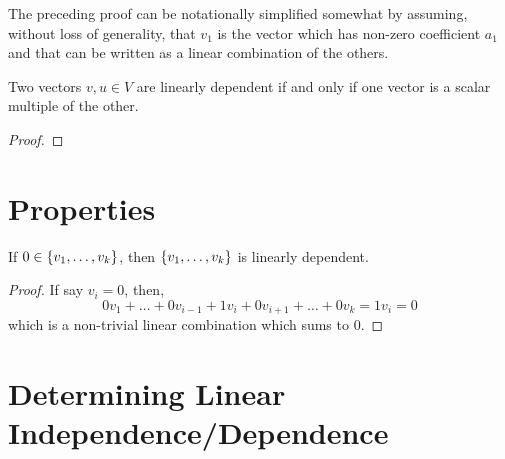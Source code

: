 \documentclass[letterpaper,12pt]{article}
\begin{document}
The preceding proof can be notationally simplified somewhat by assuming, without loss of generality, that $v_1$ is the vector which has non-zero coefficient $a_1$ and that can be written as a linear combination of the others.

\begin{corollary}
Two vectors $v, u \in V$ are linearly dependent if and only if one vector is a scalar multiple of the other.
\end{corollary}

\begin{proof}

\end{proof}

\section*{Properties}
\begin{example}
If $0 \in \left\{ v_1, \dots, v_k \right\}$, then $\left\{ v_1, \dots, v_k \right\}$ is linearly dependent.
\begin{proof}
If say $v_i = 0$, then,
\begin{equation*}
    0 v_1 + \dots + 0v_{i-1} + 1 v_i + 0 v_{i+1} + \dots + 0 v_k = 1v_i = 0
\end{equation*}
which is a non-trivial linear combination which sums to 0.
\end{proof}
\end{example}

\section*{Determining Linear Independence/Dependence}
\end{document}
